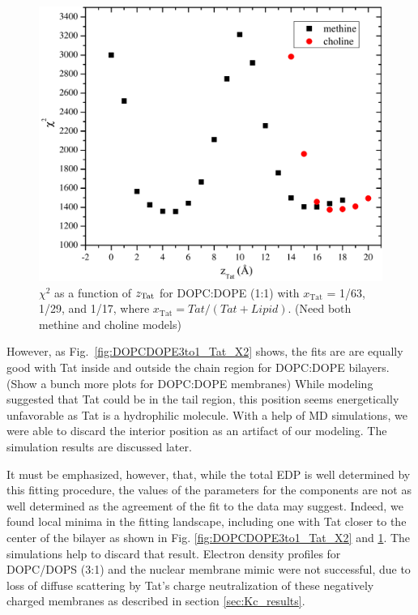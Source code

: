 \begin{figure}[htbp]
  \includegraphics[scale=0.3]{./figures/Tat/SDP_Results/DOPCDOPE1to1_Tat_16to1_X2}
  \caption{$\chi^2$ as a function of $z_\textrm{Tat}$ for DOPC:DOPE (1:1) with 
  $x_\textrm{Tat}$ = 1/63, 1/29, and 1/17, where $x_\textrm{Tat}=Tat/(Tat+Lipid)$.
  (Need both methine and choline models)}
  \label{fig:DOPCDOPE1to1_Tat_X2}
\end{figure}

However, as Fig.~\ref{fig:DOPCDOPE3to1_Tat_X2} shows, the fits are are 
equally good with Tat inside and outside the chain region for DOPC:DOPE bilayers.
(Show a bunch more plots for DOPC:DOPE membranes) 
While modeling suggested
that Tat could be in the tail region, this position seems energetically 
unfavorable as Tat is a hydrophilic molecule. With a help of MD simulations,
we were able to discard the interior position as an artifact of our 
modeling. The simulation results are discussed later.

It
must be emphasized, however, that, while the total EDP is well determined by 
this fitting
procedure, the values of the parameters for the components are not as well 
determined as the agreement of the fit to the data may suggest. 
Indeed, we found local
minima in the fitting landscape, including one with Tat closer to the center 
of the bilayer as
shown in Fig. \ref{fig:DOPCDOPE3to1_Tat_X2} and \ref{fig:DOPCDOPE1to1_Tat_X2}. 
The simulations help to discard that result. 
Electron density profiles for DOPC/DOPS (3:1) and the nuclear membrane 
mimic were not
successful, due to loss of diffuse scattering by Tat’s charge neutralization 
of these negatively
charged membranes as described in section \ref{sec:Kc_results}.

